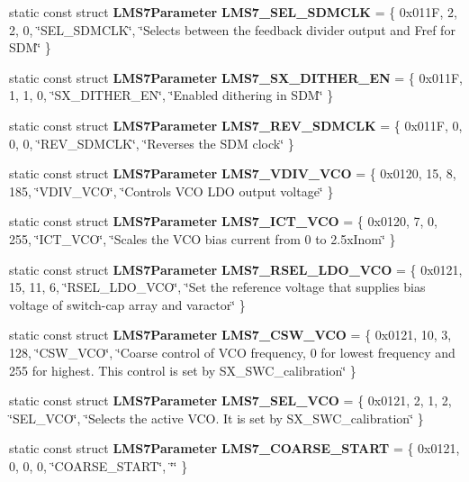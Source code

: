 \begin{DoxyCompactItemize}
static const struct {\bf L\+M\+S7\+Parameter} {\bf L\+M\+S7\+\_\+\+S\+E\+L\+\_\+\+S\+D\+M\+C\+LK} = \{ 0x011\+F, 2, 2, 0, \char`\"{}\+S\+E\+L\+\_\+\+S\+D\+M\+C\+L\+K\char`\"{}, \char`\"{}\+Selects between the feedback divider output and Fref for S\+D\+M\char`\"{} \}
\item 
static const struct {\bf L\+M\+S7\+Parameter} {\bf L\+M\+S7\+\_\+\+S\+X\+\_\+\+D\+I\+T\+H\+E\+R\+\_\+\+EN} = \{ 0x011\+F, 1, 1, 0, \char`\"{}\+S\+X\+\_\+\+D\+I\+T\+H\+E\+R\+\_\+\+E\+N\char`\"{}, \char`\"{}\+Enabled dithering in S\+D\+M\char`\"{} \}
\item 
static const struct {\bf L\+M\+S7\+Parameter} {\bf L\+M\+S7\+\_\+\+R\+E\+V\+\_\+\+S\+D\+M\+C\+LK} = \{ 0x011\+F, 0, 0, 0, \char`\"{}\+R\+E\+V\+\_\+\+S\+D\+M\+C\+L\+K\char`\"{}, \char`\"{}\+Reverses the S\+D\+M clock\char`\"{} \}
\item 
static const struct {\bf L\+M\+S7\+Parameter} {\bf L\+M\+S7\+\_\+\+V\+D\+I\+V\+\_\+\+V\+CO} = \{ 0x0120, 15, 8, 185, \char`\"{}\+V\+D\+I\+V\+\_\+\+V\+C\+O\char`\"{}, \char`\"{}\+Controls V\+C\+O L\+D\+O output voltage\char`\"{} \}
\item 
static const struct {\bf L\+M\+S7\+Parameter} {\bf L\+M\+S7\+\_\+\+I\+C\+T\+\_\+\+V\+CO} = \{ 0x0120, 7, 0, 255, \char`\"{}\+I\+C\+T\+\_\+\+V\+C\+O\char`\"{}, \char`\"{}\+Scales the V\+C\+O bias current from 0 to 2.\+5x\+Inom\char`\"{} \}
\item 
static const struct {\bf L\+M\+S7\+Parameter} {\bf L\+M\+S7\+\_\+\+R\+S\+E\+L\+\_\+\+L\+D\+O\+\_\+\+V\+CO} = \{ 0x0121, 15, 11, 6, \char`\"{}\+R\+S\+E\+L\+\_\+\+L\+D\+O\+\_\+\+V\+C\+O\char`\"{}, \char`\"{}\+Set the reference voltage that supplies bias voltage of switch-\/cap array and varactor\char`\"{} \}
\item 
static const struct {\bf L\+M\+S7\+Parameter} {\bf L\+M\+S7\+\_\+\+C\+S\+W\+\_\+\+V\+CO} = \{ 0x0121, 10, 3, 128, \char`\"{}\+C\+S\+W\+\_\+\+V\+C\+O\char`\"{}, \char`\"{}\+Coarse control of V\+C\+O frequency, 0 for lowest frequency and 255 for highest. This control is set by S\+X\+\_\+\+S\+W\+C\+\_\+calibration\char`\"{} \}
\item 
static const struct {\bf L\+M\+S7\+Parameter} {\bf L\+M\+S7\+\_\+\+S\+E\+L\+\_\+\+V\+CO} = \{ 0x0121, 2, 1, 2, \char`\"{}\+S\+E\+L\+\_\+\+V\+C\+O\char`\"{}, \char`\"{}\+Selects the active V\+C\+O. It is set by S\+X\+\_\+\+S\+W\+C\+\_\+calibration\char`\"{} \}
\item 
static const struct {\bf L\+M\+S7\+Parameter} {\bf L\+M\+S7\+\_\+\+C\+O\+A\+R\+S\+E\+\_\+\+S\+T\+A\+RT} = \{ 0x0121, 0, 0, 0, \char`\"{}\+C\+O\+A\+R\+S\+E\+\_\+\+S\+T\+A\+R\+T\char`\"{}, \char`\"{}\char`\"{} \}

\end{DoxyCompactItemize}
